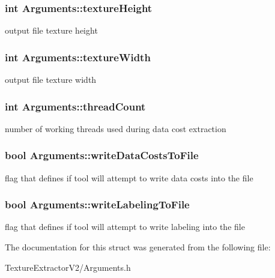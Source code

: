 \subsubsection[{texture\+Height}]{\setlength{\rightskip}{0pt plus 5cm}int Arguments\+::texture\+Height}\label{struct_arguments_acba64f044d4603abac85ba2cf1b50b75}
output file texture height \hypertarget{struct_arguments_a53b1eb430f4ea67ffd9a85696a295cd0}{}
\subsubsection[{texture\+Width}]{\setlength{\rightskip}{0pt plus 5cm}int Arguments\+::texture\+Width}\label{struct_arguments_a53b1eb430f4ea67ffd9a85696a295cd0}
output file texture width \hypertarget{struct_arguments_a81212a8036b56467011fb90c075ec4d8}{}
\subsubsection[{thread\+Count}]{\setlength{\rightskip}{0pt plus 5cm}int Arguments\+::thread\+Count}\label{struct_arguments_a81212a8036b56467011fb90c075ec4d8}
number of working threads used during data cost extraction \hypertarget{struct_arguments_a3f797aec500d79580f523addf2a62786}{}
\subsubsection[{write\+Data\+Costs\+To\+File}]{\setlength{\rightskip}{0pt plus 5cm}bool Arguments\+::write\+Data\+Costs\+To\+File}\label{struct_arguments_a3f797aec500d79580f523addf2a62786}
flag that defines if tool will attempt to write data costs into the file \hypertarget{struct_arguments_ac81dde9796306362b5c06f2d62a901ea}{}
\subsubsection[{write\+Labeling\+To\+File}]{\setlength{\rightskip}{0pt plus 5cm}bool Arguments\+::write\+Labeling\+To\+File}\label{struct_arguments_ac81dde9796306362b5c06f2d62a901ea}
flag that defines if tool will attempt to write labeling into the file 

The documentation for this struct was generated from the following file\+:\begin{DoxyCompactItemize}
\item 
Texture\+Extractor\+V2/Arguments.\+h\end{DoxyCompactItemize}
